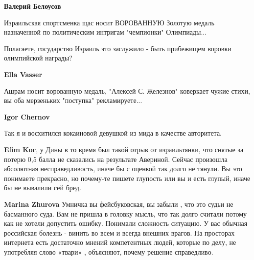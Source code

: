 \begin{itemize}
\begin{itemize}
\textbf{Валерий Белоусов} 

Израильская спортсменка щас носит ВОРОВАННУЮ Золотую медаль назначенной по
политическим интригам "чемпионки" Олимпиады...

Полагаете, государство Израиль это заслужило - быть прибежищем воровки
олимпийской награды?


 
\textbf{Ella Vasser} 

Ашрам носит ворованную медаль, "Алексей С. Железнов" коверкает чужие стихи, вы
оба мерзеньких "поступка" рекламируете...


 
\textbf{Igor Chernov} 

Так я и восхитился кокаиновой девушкой из мида в качестве авторитета.


 
\textbf{Efim Kor}, у Дины в то время был такой отрыв от израильтянки, что
снятые за потерю 0,5 балла не сказались на результате Авериной. Сейчас
произошла абсолютная несправедливость, иначе бы с оценкой так долго не тянули.
Вы это понимаете прекрасно, но почему-те пишете глупость или вы и есть глупый,
иначе бы не вывалили сей бред.

 
\textbf{Marina Zhurova} Умничка вы фейсбуковская, вы забыли , что это судьи не
басманного суда. Вам не пришла в головку мысль, что так долго считали потому
как не хотели допустить ошибку. Понимали сложность ситуацию. У вас обычная
российская болезнь - винить во всем и всегда внешних врагов. На просторах
интернета есть достаточно мнений компетентных людей, которые по делу, не
употребляя слово «твари» , объясняют, почему решение справедливо.


\end{itemize}
\end{itemize}

